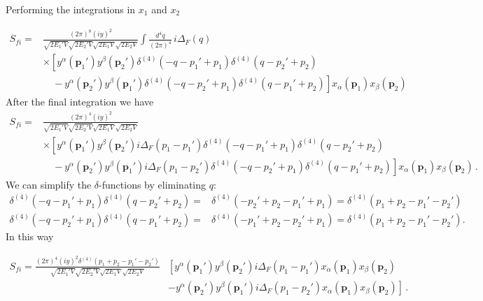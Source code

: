 Performing the integrations in $x_1$ and $x_2$

\begin{align}
   S_{fi}
    =&\frac{(2\pi)^8(iy)^2 }{\sqrt{2 E_1'V}\sqrt{2 E_2'V}\sqrt{2 E_1V}\sqrt{2 E_2V}}\int\frac{d^4q}{(2\pi)^4}\,i\Delta_F(q)
\nonumber\\
&
 \times \left[ y^{\alpha}(\mathbf{p}_1')y^{\beta}(\mathbf{p}_2')\delta^{(4)}\left(-q-p_1'+p_1  \right)\delta^{(4)}\left(q-p_2'+p_2  \right)   \right. \nonumber\\
&\left. 
\quad    - y^{\alpha}(\mathbf{p}_2')y^{\beta}(\mathbf{p}_1')\delta^{(4)}\left(-q-p_2'+p_1  \right)\delta^{(4)}\left(q-p_1'+p_2  \right)
  \right]x_{\alpha}(\mathbf{p}_1)x_{\beta}(\mathbf{p}_2)
\end{align}
After the final integration we have
\begin{align}
     S_{fi}
    =&\frac{(2\pi)^4(iy)^2 }{\sqrt{2 E_1'V}\sqrt{2 E_2'V}\sqrt{2 E_1V}\sqrt{2 E_2V}}
\nonumber\\
&
 \times \left[ y^{\alpha}(\mathbf{p}_1')y^{\beta}(\mathbf{p}_2')i\Delta_F(p_1-p_1')\delta^{(4)}\left(-q-p_1'+p_1  \right)\delta^{(4)}\left(q-p_2'+p_2  \right)   \right. \nonumber\\
&\left. 
\quad    - y^{\alpha}(\mathbf{p}_2')y^{\beta}(\mathbf{p}_1')i\Delta_F(p_1-p_2')\delta^{(4)}\left(-q-p_2'+p_1  \right)\delta^{(4)}\left(q-p_1'+p_2  \right)
  \right]x_{\alpha}(\mathbf{p}_1)x_{\beta}(\mathbf{p}_2)\,.
\end{align}
We can simplify the $\delta$-functions by eliminating $q$:
\begin{align}
  \delta^{(4)}\left(-q-p_1'+p_1  \right)\delta^{(4)}\left(q-p_2'+p_2  \right)=&\delta^{(4)}\left(-p_2'+p_2-p_1'+p_1\right)=\delta^{(4)}\left(p_1+p_2-p_1'-p_2'\right) \nonumber\\
  \delta^{(4)}\left(-q-p_2'+p_1  \right)\delta^{(4)}\left(q-p_1'+p_2  \right)=&\delta^{(4)}\left(-p_1'+p_2-p_2'+p_1\right)=\delta^{(4)}\left(p_1+p_2-p_1'-p_2'\right). 
\end{align}
In this way

\begin{align}
     S_{fi}
    =\frac{(2\pi)^4(iy)^2\delta^{(4)}\left(p_1+p_2-p_1'-p_2'\right) }{\sqrt{2 E_1'V}\sqrt{2 E_2'V}\sqrt{2 E_1V}\sqrt{2 E_2V}}
  &\left[ y^{\alpha}(\mathbf{p}_1')y^{\beta}(\mathbf{p}_2')i\Delta_F(p_1-p_1')x_{\alpha}(\mathbf{p}_1)x_{\beta}(\mathbf{p}_2)   \right. \nonumber\\
&\left. 
  - y^{\alpha}(\mathbf{p}_2')y^{\beta}(\mathbf{p}_1')i\Delta_F(p_1-p_2')x_{\alpha}(\mathbf{p}_1)x_{\beta}(\mathbf{p}_2)
  \right]\,.
\end{align}

